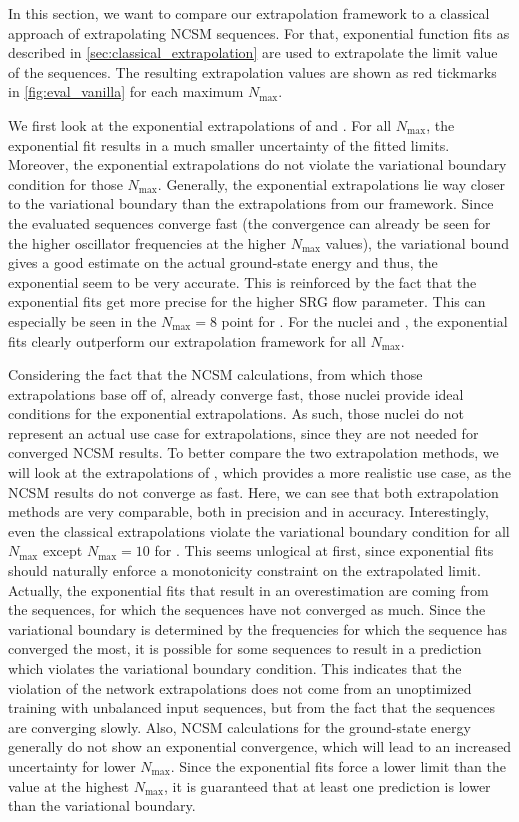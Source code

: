 In this section, we want to compare our extrapolation framework to a classical approach of extrapolating NCSM sequences. For that, exponential function fits as described in \autoref{sec:classical_extrapolation} are used to extrapolate the limit value of the sequences. The resulting extrapolation values are shown as red tickmarks in \autoref{fig:eval_vanilla} for each maximum $N_\mathrm{max}$.

We first look at the exponential extrapolations of  and . For all $N_\mathrm{max}$, the exponential fit results in a much smaller uncertainty of the fitted limits. Moreover, the exponential extrapolations do not violate the variational boundary condition for those $N_\mathrm{max}$. Generally, the exponential extrapolations lie way closer to the variational boundary than the extrapolations from our framework. Since the evaluated sequences converge fast (the convergence can already be seen for the higher oscillator frequencies at the higher $N_\mathrm{max}$ values), the variational bound gives a good estimate on the actual ground-state energy and thus, the exponential seem to be very accurate. This is reinforced by the fact that the exponential fits get more precise for the higher SRG flow parameter. This can especially be seen in the $N_\mathrm{max}=8$ point for . For the nuclei  and , the exponential fits clearly outperform our extrapolation framework for all $N_\mathrm{max}$.

Considering the fact that the NCSM calculations, from which those extrapolations base off of, already converge fast, those nuclei provide ideal conditions for the exponential extrapolations. As such, those nuclei do not represent an actual use case for extrapolations, since they are not needed for converged NCSM results. To better compare the two extrapolation methods, we will look at the extrapolations of , which provides a more realistic use case, as the NCSM results do not converge as fast. Here, we can see that both extrapolation methods are very comparable, both in precision and in accuracy. Interestingly, even the classical extrapolations violate the variational boundary condition for all $N_\mathrm{max}$ except $N_\mathrm{max} = 10$ for . This seems unlogical at first, since exponential fits should naturally enforce a monotonicity constraint on the extrapolated limit. Actually, the exponential fits that result in an overestimation are coming from the sequences, for which the sequences have not converged as much. Since the variational boundary is determined by the frequencies for which the sequence has converged the most, it is possible for some sequences to result in a prediction which violates the variational boundary condition. This indicates that the violation of the network extrapolations does not come from an unoptimized training with unbalanced input sequences, but from the fact that the sequences are converging slowly. Also, NCSM calculations for the ground-state energy generally do not show an exponential convergence, which will lead to an increased uncertainty for lower $N_\mathrm{max}$. Since the exponential fits force a lower limit than the value at the highest $N_\mathrm{max}$, it is guaranteed that at least one prediction is lower than the variational boundary.

